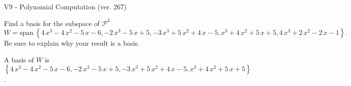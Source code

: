 \begin{exercise}
  \begin{exerciseTitle}V9 - Polynomial Computation (ver. 267)\end{exerciseTitle}
  \begin{exerciseStatement}
    Find a basis for the subspace of \(\mathcal{P}^3\) 
\[W=\mathrm{span}\ \left\{4 \, x^{3} - 4 \, x^{2} - 5 \, x - 6 , -2 \, x^{3} - 5 \, x + 5 , -3 \, x^{3} + 5 \, x^{2} + 4 \, x - 5 , x^{3} + 4 \, x^{2} + 5 \, x + 5 , 4 \, x^{3} + 2 \, x^{2} - 2 \, x - 1\right\}.\]
 Be sure to explain why your result is a basis.


  \end{exerciseStatement}
  \begin{exerciseAnswer}
   A basis of \(W\) is  \(\left\{4 \, x^{3} - 4 \, x^{2} - 5 \, x - 6 , -2 \, x^{3} - 5 \, x + 5 , -3 \, x^{3} + 5 \, x^{2} + 4 \, x - 5 , x^{3} + 4 \, x^{2} + 5 \, x + 5\right\}\).
  


  \end{exerciseAnswer}
\end{exercise}